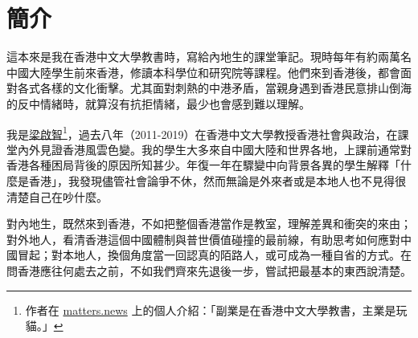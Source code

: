 \section*{簡介}
這本來是我在香港中文大學教書時，寫給內地生的課堂筆記。現時每年有約兩萬名中國大陸學生前來香港，修讀本科學位和研究院等課程。他們來到香港後，都會面對各式各樣的文化衝擊。尤其面對刺熱的中港矛盾，當親身遇到香港民意排山倒海的反中情緒時，就算沒有抗拒情緒，最少也會感到難以理解。

我是\href{https://matters.news/@leungkaichihk}{梁啟智}\footnote{作者在 \href{https://matters.news/@leungkaichihk}{matters.news} 上的個人介紹：「副業是在香港中文大學教書，主業是玩貓。」}，過去八年（2011-2019）在香港中文大學教授香港社會與政治，在課堂內外見證香港風雲色變。我的學生大多來自中國大陸和世界各地，上課前通常對香港各種困局背後的原因所知甚少。年復一年在驟變中向背景各異的學生解釋「什麼是香港」，我發現儘管社會論爭不休，然而無論是外來者或是本地人也不見得很清楚自己在吵什麼。

對內地生，既然來到香港，不如把整個香港當作是教室，理解差異和衝突的來由；對外地人，看清香港這個中國體制與普世價值碰撞的最前線，有助思考如何應對中國冒起；對本地人，換個角度當一回認真的陌路人，或可成為一種自省的方式。在問香港應往何處去之前，不如我們齊來先退後一步，嘗試把最基本的東西說清楚。